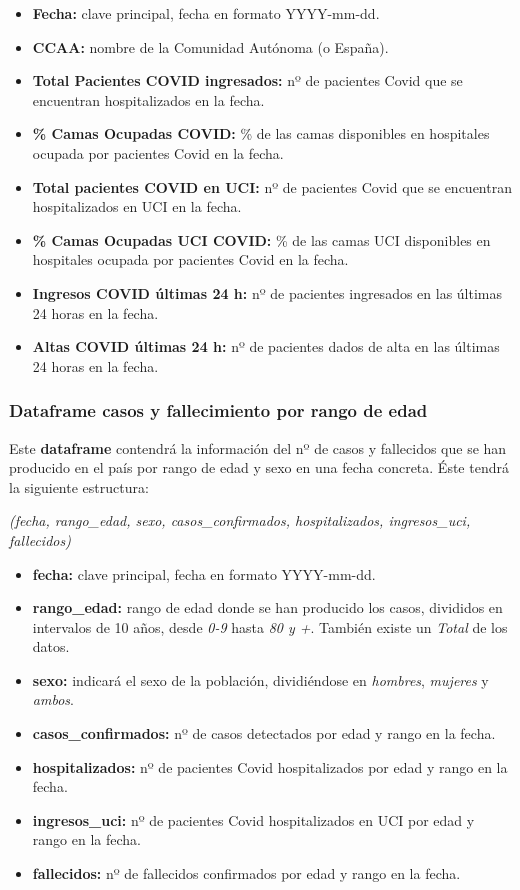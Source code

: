 \begin{itemize}
	\item \textbf{Fecha:} clave principal, fecha en formato YYYY-mm-dd.
	\item \textbf{CCAA:} nombre de la Comunidad Autónoma (o España).
	\item \textbf{Total Pacientes COVID ingresados:} nº de pacientes Covid que se encuentran hospitalizados en la fecha.
	\item \textbf{\% Camas Ocupadas COVID:} \% de las camas disponibles en hospitales ocupada por pacientes Covid en la fecha.
	\item \textbf{Total pacientes COVID en UCI:} nº de pacientes Covid que se encuentran hospitalizados en UCI en la fecha.
	\item \textbf{\% Camas Ocupadas UCI COVID:} \% de las camas UCI disponibles en hospitales ocupada por pacientes Covid en la fecha.
	\item \textbf{Ingresos COVID últimas 24 h:} nº de pacientes ingresados en las últimas 24 horas en la fecha.
	\item \textbf{Altas COVID últimas 24 h:} nº de pacientes dados de alta en las últimas 24 horas en la fecha.
\end{itemize}

\subsubsection{Dataframe casos y fallecimiento por rango de edad}

Este \textbf{dataframe} contendrá la información del nº de casos y fallecidos que se han producido en el país por rango de edad y sexo en una fecha concreta. Éste tendrá la siguiente estructura:

\begin{center}
	\textit{(fecha, rango\_edad, sexo, casos\_confirmados, hospitalizados, ingresos\_uci, fallecidos)}
\end{center}

\begin{itemize}
	\item \textbf{fecha:} clave principal, fecha en formato YYYY-mm-dd.
	\item \textbf{rango\_edad:} rango de edad donde se han producido los casos, divididos en intervalos de 10 años, desde \textit{0-9} hasta \textit{80 y +}. También existe un \textit{Total} de los datos.
	\item \textbf{sexo:} indicará el sexo de la población, dividiéndose en \textit{hombres}, \textit{mujeres} y \textit{ambos}.
	\item \textbf{casos\_confirmados:} nº de casos detectados por edad y rango en la fecha.
	\item \textbf{hospitalizados:} nº de pacientes Covid hospitalizados por edad y rango en la fecha.
	\item \textbf{ingresos\_uci:} nº de pacientes Covid hospitalizados en UCI por edad y rango en la fecha.
	\item \textbf{fallecidos:} nº de fallecidos confirmados por edad y rango en la fecha.
\end{itemize}

